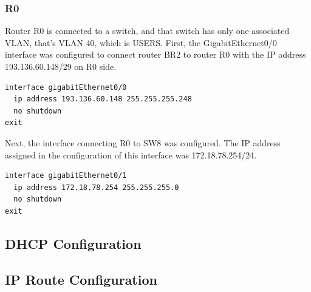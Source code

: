 \subsubsection*{R0}

Router R0 is connected to a switch, and that switch has only one associated VLAN, that's VLAN 40, which is USERS. 
First, the GigabitEthernet0/0 interface was configured to connect router BR2 to router R0 with the IP address 193.136.60.148/29 on R0 side.

\begin{lstlisting}[caption={Interface GigabitEthernet0/0 configuration on R0}, label={lst:r0-br2connection}]
interface gigabitEthernet0/0
  ip address 193.136.60.148 255.255.255.248
  no shutdown
exit
\end{lstlisting}

Next, the interface connecting R0 to SW8 was configured. The IP address assigned in the configuration of this interface was 172.18.78.254/24.
\begin{lstlisting}[caption={Configuring the GigabitEthernet0/1 interface on R0}, label={lst:r0-if_gb0/0}]
interface gigabitEthernet0/1
  ip address 172.18.78.254 255.255.255.0
  no shutdown
exit
\end{lstlisting}



\subsection{DHCP Configuration}

\subsection{IP Route Configuration}

